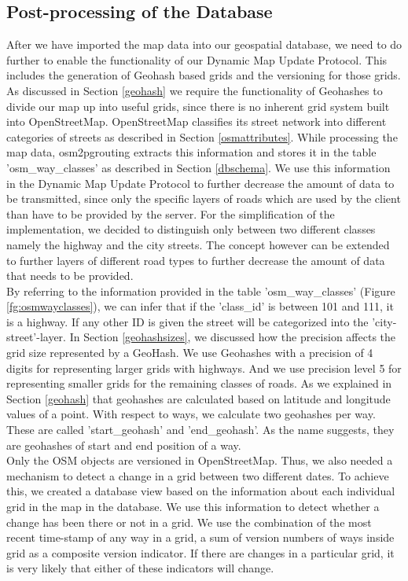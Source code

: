 \subsection{Post-processing of the Database} \label{postprocessing}
After we have imported the map data into our geospatial database, we need to do further to enable the functionality of our Dynamic Map Update Protocol. This includes the generation of Geohash based grids and the versioning for those grids. As discussed in Section \ref{geohash} we require the functionality of Geohashes to divide our map up into useful grids, since there is no inherent grid system built into OpenStreetMap. OpenStreetMap classifies its street network into different categories of streets as described in Section \ref{osmattributes}. While processing the map data, osm2pgrouting extracts this information and stores it in the table 'osm{\_}way{\_}classes' as described in Section \ref{dbschema}. We use this information in the Dynamic Map Update Protocol to further decrease the amount of data to be transmitted, since only the specific layers of roads which are used by the client than have to be provided by the server. For the simplification of the implementation, we decided to distinguish only between two different classes namely the highway and the city streets. The concept however can be extended to further layers of different road types to further decrease the amount of data that needs to be provided. 
\\

By referring to the information provided in the table 'osm{\_}way{\_}classes' (Figure \ref{fg:osmwayclasses}), we can infer that if the 'class{\_}id' is between 101 and 111, it is a highway. If any other ID is given the street will be categorized into the 'city-street'-layer. In Section \ref{geohashsizes}, we discussed how the precision affects the grid size represented by a GeoHash. We use Geohashes with a precision of 4 digits for representing larger grids with highways. And we use precision level 5 for representing smaller grids for the remaining classes of roads. As we explained in Section \ref{geohash} that geohashes are calculated based on latitude and longitude values of a point. With respect to ways, we calculate two geohashes per way. These are called 'start{\_}geohash' and 'end{\_}geohash'. As the name suggests, they are geohashes of start and end position of a way.
\\

Only the OSM objects are versioned in OpenStreetMap. Thus, we also needed a mechanism to detect a change in a grid between two different dates. To achieve this, we created a database view based on the information about each individual grid in the map in the database. We use this information to detect whether a change has been there or not in a grid. We use the combination of the most recent time-stamp of any way in a grid, a sum of version numbers of ways inside grid as a composite version indicator. If there are changes in a particular grid, it is very likely that either of these indicators will change.
\\

